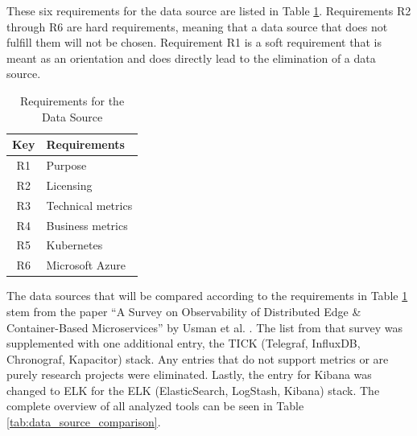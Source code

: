 These six requirements for the data source are listed in Table \ref{tab:data_source_requirements}.
Requirements R2 through R6 are hard requirements, meaning that a data source that does not fulfill them
will not be chosen. Requirement R1 is a soft requirement that is meant as an orientation and does directly
lead to the elimination of a data source.

\begin{table}[]
\centering
\begin{tabular}{c|l}
Key & Requirements \\
\hline
R1 & Purpose \\
R2 & Licensing \\
R3 & Technical metrics \\
R4 & Business metrics \\
R5 & Kubernetes \\
R6 & Microsoft Azure \\
\end{tabular}
\caption{Requirements for the Data Source}
\label{tab:data_source_requirements}
\end{table}

The data sources that will be compared according to the requirements in Table \ref{tab:data_source_requirements} stem
from the paper \enquote{A Survey on Observability of Distributed Edge {\&} Container-Based Microservices}
by Usman et al. \cite{UF+22}. The list from that survey was supplemented with one additional entry,
the TICK (Telegraf, InfluxDB, Chronograf, Kapacitor) stack. Any entries that do not support metrics or are purely research projects were eliminated.
Lastly, the entry for Kibana was changed to ELK for the ELK (ElasticSearch, LogStash, Kibana) stack.
The complete overview of all analyzed tools can be seen in Table \ref{tab:data_source_comparison}.

